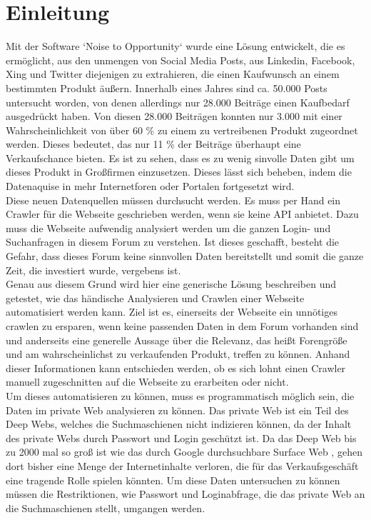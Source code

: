 \section {Einleitung}
Mit der Software `Noise to Opportunity` wurde eine Lösung entwickelt, die es ermöglicht, aus den unmengen von Social Media Posts, aus Linkedin, Facebook, Xing und Twitter diejenigen zu extrahieren, die einen Kaufwunsch an einem bestimmten Produkt äußern. Innerhalb eines Jahres sind ca. 50.000 Posts untersucht worden, von denen allerdings nur 28.000 Beiträge einen Kaufbedarf ausgedrückt haben. Von diesen 28.000 Beiträgen konnten nur 3.000 mit einer Wahrscheinlichkeit von über 60 \% zu einem zu vertreibenen Produkt zugeordnet werden. Dieses bedeutet, das nur 11 \% der Beiträge überhaupt eine Verkaufschance bieten.
Es ist zu sehen, dass es zu wenig sinvolle Daten gibt um dieses Produkt in Großfirmen einzusetzen. Dieses lässt sich beheben, indem die \\ Datenaquise in mehr Internetforen oder Portalen fortgesetzt wird.\\
Diese neuen Datenquellen müssen durchsucht werden. Es muss per Hand ein Crawler für die Webseite geschrieben werden, wenn sie keine API anbietet. Dazu muss die Webseite aufwendig analysiert werden um die ganzen Login- und Suchanfragen in diesem Forum zu verstehen. Ist dieses geschafft, besteht die Gefahr, dass dieses Forum keine sinnvollen Daten bereitstellt und somit die ganze Zeit, die investiert wurde, vergebens ist.\\
Genau aus diesem Grund wird hier eine generische Lösung beschreiben und getestet, wie das händische Analysieren und Crawlen einer Webseite automatisiert werden kann. Ziel ist es, einerseits der Webseite ein unnötiges crawlen zu ersparen, wenn keine passenden Daten in dem Forum vorhanden sind und anderseits eine generelle Aussage über die Relevanz, das heißt Forengröße und am wahrscheinlichst zu verkaufenden Produkt, treffen zu können. Anhand dieser Informationen kann entschieden werden, ob es sich lohnt einen Crawler manuell zugeschnitten auf die Webseite zu erarbeiten oder nicht.\\
Um dieses automatisieren zu können, muss es programmatisch möglich sein, die Daten im private Web analysieren zu können. Das private Web ist ein Teil des Deep Webs, welches die Suchmaschienen nicht indizieren können, da der Inhalt des private Webs durch Passwort und Login geschützt ist. Da das Deep Web bis zu 2000 mal so groß ist wie das durch Google durchsuchbare Surface Web \cite{gupta2014comparative}, gehen dort bisher eine Menge der Internetinhalte verloren, die für das Verkaufsgeschäft eine tragende Rolle spielen könnten. Um diese Daten untersuchen zu können müssen die Restriktionen, wie Passwort und Loginabfrage, die das private Web an die Suchmaschienen stellt, umgangen werden.
